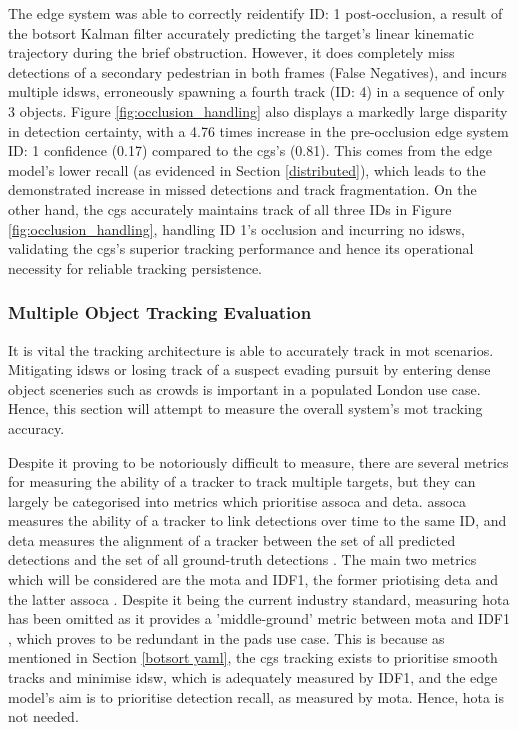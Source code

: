 \documentclass{report_template_oxford}
\begin{document}
The edge system was able to correctly reidentify ID: 1  post-occlusion, a result of the \gls{botsort} Kalman filter accurately predicting the target's linear kinematic trajectory during the brief obstruction. However, it does completely miss detections of a secondary pedestrian in both frames (False Negatives), and incurs multiple \glspl{idsw}, erroneously spawning a fourth track (ID: 4) in a sequence of only 3 objects. Figure \ref{fig:occlusion_handling} also displays a markedly large disparity in detection certainty, with a 4.76 times increase in the pre-occlusion edge system ID: 1 confidence (0.17) compared to the \gls{cgs}'s (0.81). This comes from the  edge model's lower recall (as evidenced in Section \ref{distributed}), which leads to the demonstrated increase in missed detections and track fragmentation. On the other hand, the \gls{cgs} accurately maintains track of all three IDs in Figure \ref{fig:occlusion_handling}, handling ID 1's occlusion and incurring no \glspl{idsw}, validating the \gls{cgs}'s superior tracking performance and hence its operational necessity for reliable tracking persistence.  

\subsubsection{Multiple Object Tracking Evaluation}
It is vital the tracking architecture is able to accurately track in \gls{mot} scenarios. Mitigating \glspl{idsw} or losing track of a suspect evading pursuit by entering dense object sceneries such as crowds is important in a populated London use case. Hence, this section will attempt to measure the overall system's \gls{mot} tracking accuracy. 

Despite it proving to be notoriously difficult to measure, there are several metrics for measuring the ability of a tracker to track multiple targets, but they can largely be categorised into metrics which prioritise \gls{assoca} and \gls{deta}. \gls{assoca} measures the ability of a tracker to link detections over time to the same ID, and \gls{deta} measures the alignment of a tracker between the set of all predicted detections and the set of all ground-truth detections \cite{mendez2024motmetrics}. The main two metrics which will be considered are the \gls{mota} and IDF1, the former priotising \gls{deta} and the latter \gls{assoca} \cite{mendez2024motmetrics}. Despite it being the current industry standard, measuring \gls{hota} has been omitted as it provides a 'middle-ground' metric between \gls{mota} and IDF1 \cite{Luiten_2020}, which proves to be redundant in the \gls{pads} use case. This is because as mentioned in Section \ref{botsort yaml}, the \gls{cgs} tracking exists to prioritise smooth tracks and minimise \gls{idsw}, which is adequately measured by IDF1, and the edge model's aim is to prioritise detection recall, as measured by \gls{mota}. Hence, \gls{hota} is not needed.
\end{document}

